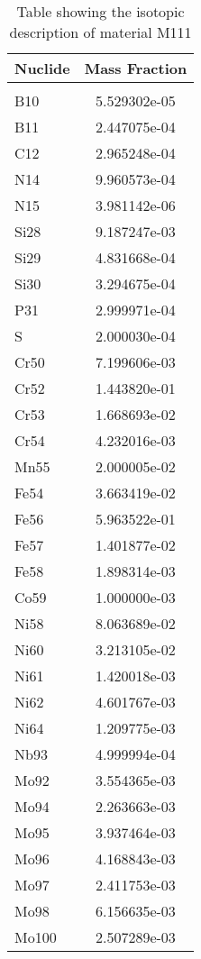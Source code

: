 \begin{centering}
\begin{table}[ht!]
\begin{tabular}{l | c}
\hline
Nuclide & Mass Fraction\\
\hline
\\
B10 & 5.529302e-05\\
B11 & 2.447075e-04\\
C12 & 2.965248e-04\\
N14 & 9.960573e-04\\
N15 & 3.981142e-06\\
Si28 & 9.187247e-03\\
Si29 & 4.831668e-04\\
Si30 & 3.294675e-04\\
P31 & 2.999971e-04\\
S & 2.000030e-04\\
Cr50 & 7.199606e-03\\
Cr52 & 1.443820e-01\\
Cr53 & 1.668693e-02\\
Cr54 & 4.232016e-03\\
Mn55 & 2.000005e-02\\
Fe54 & 3.663419e-02\\
Fe56 & 5.963522e-01\\
Fe57 & 1.401877e-02\\
Fe58 & 1.898314e-03\\
Co59 & 1.000000e-03\\
Ni58 & 8.063689e-02\\
Ni60 & 3.213105e-02\\
Ni61 & 1.420018e-03\\
Ni62 & 4.601767e-03\\
Ni64 & 1.209775e-03\\
Nb93 & 4.999994e-04\\
Mo92 & 3.554365e-03\\
Mo94 & 2.263663e-03\\
Mo95 & 3.937464e-03\\
Mo96 & 4.168843e-03\\
Mo97 & 2.411753e-03\\
Mo98 & 6.156635e-03\\
Mo100 & 2.507289e-03
\end{tabular}
\caption{Table showing the isotopic description of material M111}
\label{table:material_M111}
\end{table}\clearpage


\end{centering}

